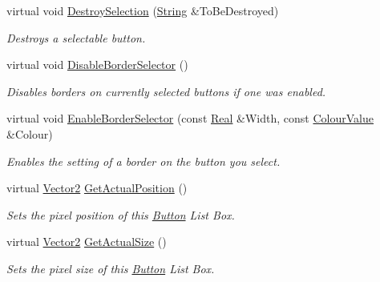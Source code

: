 \begin{DoxyCompactItemize}
virtual void \hyperlink{classphys_1_1UI_1_1ButtonListBox_a2717ab6e1ad39bb7db634a97c4f4157a}{DestroySelection} (\hyperlink{namespacephys_aa03900411993de7fbfec4789bc1d392e}{String} \&ToBeDestroyed)
\begin{DoxyCompactList}\small\item\em Destroys a selectable button. \item\end{DoxyCompactList}\item 
\hypertarget{classphys_1_1UI_1_1ButtonListBox_ae7ea19d82a4c9a7d4262bf41e4204fce}{
virtual void \hyperlink{classphys_1_1UI_1_1ButtonListBox_ae7ea19d82a4c9a7d4262bf41e4204fce}{DisableBorderSelector} ()}
\label{classphys_1_1UI_1_1ButtonListBox_ae7ea19d82a4c9a7d4262bf41e4204fce}

\begin{DoxyCompactList}\small\item\em Disables borders on currently selected buttons if one was enabled. \item\end{DoxyCompactList}\item 
virtual void \hyperlink{classphys_1_1UI_1_1ButtonListBox_a7171571edf9dbf1a5f5543ecdaf119eb}{EnableBorderSelector} (const \hyperlink{namespacephys_af7eb897198d265b8e868f45240230d5f}{Real} \&Width, const \hyperlink{classphys_1_1ColourValue}{ColourValue} \&Colour)
\begin{DoxyCompactList}\small\item\em Enables the setting of a border on the button you select. \item\end{DoxyCompactList}\item 
virtual \hyperlink{classphys_1_1Vector2}{Vector2} \hyperlink{classphys_1_1UI_1_1ButtonListBox_addc5d7c6ab2a48ffa0d4b2e46c20d9a5}{GetActualPosition} ()
\begin{DoxyCompactList}\small\item\em Sets the pixel position of this \hyperlink{classphys_1_1UI_1_1Button}{Button} List Box. \item\end{DoxyCompactList}\item 
virtual \hyperlink{classphys_1_1Vector2}{Vector2} \hyperlink{classphys_1_1UI_1_1ButtonListBox_a77d992f8858bf9b9eeb190dd1ea8a4fd}{GetActualSize} ()
\begin{DoxyCompactList}\small\item\em Sets the pixel size of this \hyperlink{classphys_1_1UI_1_1Button}{Button} List Box. \item\end{DoxyCompactList}\item 

\end{DoxyCompactItemize}
